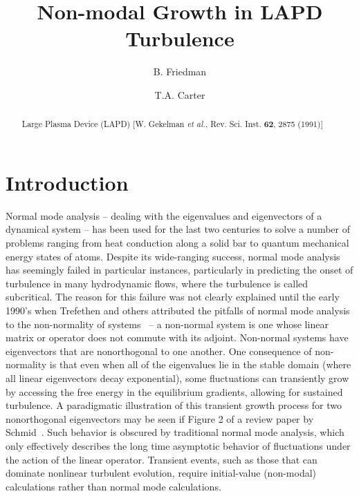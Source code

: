 \documentclass[showpacs,preprintnumbers,amsmath,amssymb,superscriptaddress,aip]{revtex4-1}
\begin{document}
\title{Non-modal Growth in LAPD Turbulence}

\author{B. Friedman}

\author{T.A. Carter}




\begin{abstract}
Large Plasma Device (LAPD) [W. Gekelman \emph{et al.}, Rev. Sci. Inst. {\bf 62}, 2875 (1991)] 
\end{abstract}

\maketitle

\section{Introduction}

Normal mode analysis -- dealing with the eigenvalues and eigenvectors of a dynamical system -- has been used for the last two centuries to solve a number of problems ranging from
heat conduction along a solid bar to quantum mechanical energy states of atoms. Despite its wide-ranging success, normal mode analysis has seemingly failed in particular instances,
particularly in predicting the onset of turbulence in many hydrodynamic flows, where the turbulence is called subcritical. 
The reason for this failure was not clearly explained until the early 1990's when Trefethen and others attributed the pitfalls of normal mode analysis to the non-normality of
systems~\cite{trefethen1993,trefethen2005} -- a non-normal system is one whose linear matrix or operator does not commute with its adjoint. 
Non-normal systems have eigenvectors that are nonorthogonal to one another. One consequence of non-normality is that even when all of the eigenvalues lie in the stable domain 
(where all linear eigenvectors decay exponential), some fluctuations can transiently grow by accessing the free energy in the equilibrium gradients, allowing for sustained turbulence. 
A paradigmatic illustration of this transient growth process for two nonorthogonal eigenvectors may be seen if Figure 2 of a review paper by Schmid~\cite{schmid2007}.
Such behavior is obscured by traditional normal mode analysis, which only effectively describes the long time asymptotic behavior of fluctuations under the 
action of the linear operator. Transient events, such as those that can dominate nonlinear turbulent evolution, require initial-value (non-modal) calculations rather than normal mode calculations.
\end{document}

